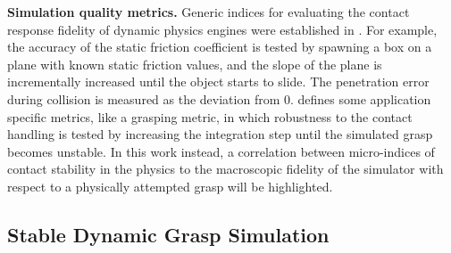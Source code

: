 




{\bf Simulation quality metrics.}
Generic indices for evaluating the contact response fidelity of dynamic physics engines were established in \cite{Boeing07}. For example, the accuracy of the static friction coefficient is tested by spawning a box on a plane with known static friction values, and the slope of the plane is incrementally increased until the object starts to slide.  The penetration error during collision is measured as the deviation from 0.  \cite{Erez15} defines some application specific metrics, like a grasping metric, in which robustness to the contact handling is tested by increasing the integration step until the simulated grasp becomes unstable.  In this work instead, a correlation between micro-indices of contact stability in the physics to the macroscopic fidelity of the simulator with respect to a physically attempted grasp will be highlighted.

\subsection{Stable Dynamic Grasp Simulation}
\label{methods}

